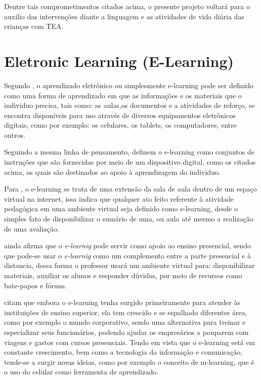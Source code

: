 	Dentre tais comprometimentos citados acima, o presente projeto voltará para o auxilio das intervenções diante a linguagem e as atividades de vida diária das crianças com TEA.
		
	\section{Eletronic Learning (E-Learning)}
	Segundo , o aprendizado eletrônico ou simplesmente e-learning pode ser definido como uma forma de aprendizado em que as informações e os materiais que o individuo precisa, tais como: as aulas,os documentos e a atividades de reforço, se encontra disponíveis para uso através de diversos equipamentos eletrônicos digitais, como por exemplo: os celulares, os tablets, os computadores, entre outros. 
	
	Seguindo a mesma linha de pensamento,  definem o e-learning como  conjuntos de instruções que são fornecidas por meio de um dispositivo digital, como os citados acima, os quais são destinados ao apoio à aprendizagem do individuo.
	
	Para , o e-learning se trata de uma extensão da sala de aula dentro de um espaço virtual na internet, isso indica que qualquer ato feito referente à atividade pedagógica em uma ambiente virtual seja definido como e-learning, desde o simples fato de disponibilizar o sumário de uma, ou aula até mesmo a realização de uma avaliação. 
	
	  ainda afirma que o \textit{e-learnig} pode servir como apoio ao ensino presencial, sendo que pode-se usar o \textit{e-learnig} como um complemento entre a parte presencial e à distancia, dessa forma o professor usará um ambiente virtual para: disponibilizar materiais,  auxiliar os alunos e responder dúvidas, por meio de recursos como bate-papos e fóruns.
	
	
	 citam que embora o e-learning tenha surgido primeiramente para atender às instituições de ensino superior, ela tem crescido e se espalhado diferentes área, como por exemplo o mundo corporativo, sendo uma alternativa para treinar e especializar seus funcionários, podendo ajudar os empresários a pouparem com viagens e gastos com cursos presenciais. Tendo em vista que o e-learning está em constante crescimento, bem como a tecnologia da informação e comunicação, tende-se a surgir novas ideias, como por exemplo o conceito de m-learning, que é o uso do celular como ferramenta de aprendizado.
	
